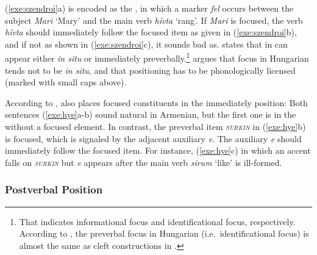 \noindent (\ref{exe:szendroi}a) is encoded as the , in which a marker \textit{fel} occurs between the subject
\textit{Mari} `Mary' and the main verb \textit{h{\'i}vta} `rang'. If
\textit{Mari} is focused, the verb \textit{h{\'i}vta} should
immediately follow the focused item as given in (\ref{exe:szendroi}b),
and if not as shown in (\ref{exe:szendroi}c), it sounds bad
as. \citet{kiss:98} states that  in  can appear either
\textit{in situ} or immediately preverbally.\footnote{That indicates
  informational focus and identificational focus,
  respectively. According to \citet{kiss:98}, the preverbal focus in
  Hungarian (i.e.\ identificational focus) is almost the same as cleft
  constructions in .} \citet{szendroi:01} argues
that focus in Hungarian tends not to be \textit{in situ}, and that
 positioning has to be phonologically licensed (marked
with small caps above).


According to \citet{tamrazian:91},  also places focused
constituents in the immediately  position: Both sentences
(\ref{exe:hye}a-b) sound natural in Armenian, but the first one is in
the  without a focused element. In contrast, the
preverbal item \textit{\textsc{surkin}} in (\ref{exe:hye}b) is
focused, which is signaled by the adjacent auxiliary \textit{e}. The
auxiliary \textit{e} should immediately follow the focused item. For
instance, (\ref{exe:hye}c) in which an accent falls on
\textit{\textsc{surkin}} but \textit{e} appears after the main verb
\textit{sirum} `like' is ill-formed.




\subsubsection{Postverbal Position}
\label{4:sssec:postverbal}


